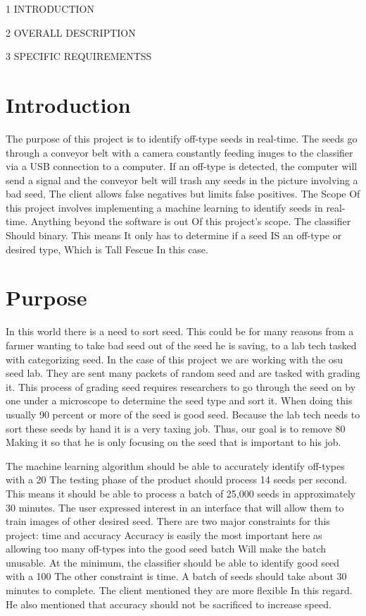 \documentclass[onecolumn, draftclsnofoot,10pt, compsoc]{IEEEtran}
\begin{document}
1 INTRODUCTION

2 OVERALL DESCRIPTION

3 SPECIFIC REQUIREMENTSS


\section{Introduction}
The purpose of this project is to identify off-type seeds in real-time.
The seeds go through a conveyor belt with a camera constantly feeding inuges to the classifier via a USB connection to a computer.
If an off-type is detected, the computer will send a signal and the conveyor belt will trash any seeds in the picture involving a bad seed, The client allows false negatives but limits false positives.
The Scope Of this project involves implementing a machine learning to identify seeds in real-time.
Anything beyond the software is out Of this project's scope.
The classifier Should binary.
This means It only has to determine if a seed IS an off-type or desired type, Which is Tall Fescue In this case.
 \section{Purpose}
In this world there is a need to sort seed.
This could be for many reasons from a farmer wanting to take bad seed out of the seed he is saving, to a lab tech tasked with categorizing seed.
In the case of this project we are working with the osu seed lab.
They are sent many packets of random seed and are tasked with grading it.
This process of grading seed requires researchers to go through the seed on by one under a microscope to determine the seed type and sort it.
When doing this usually 90 percent or more of the seed is good seed.
Because the lab tech needs to sort these seeds by hand it is a very taxing job.
Thus, our goal is to remove 80%
Making it so that he is only focusing on the seed that is important to his job.

The machine learning algorithm should be able to accurately identify off-types with a 20%
The testing phase of the product should process 14 seeds per second.
This means it should be able to process a batch of 25,000 seeds in approximately 30 minutes.
The user expressed interest in an interface that will allow them to train images of other desired seed.
There are two major constraints for this project: time and accuracy Accuracy is easily the most
important here as allowing too many off-types into the good seed batch Will make the batch unusable.
At the minimum, the classifier should be able to identify good seed with a 100%
The other constraint is time.
A batch of seeds should take about 30 minutes to complete.
The client mentioned they are more flexible In this regard.
He also mentioned that accuracy should not be sacrificed to increase speed.
\end{document}
